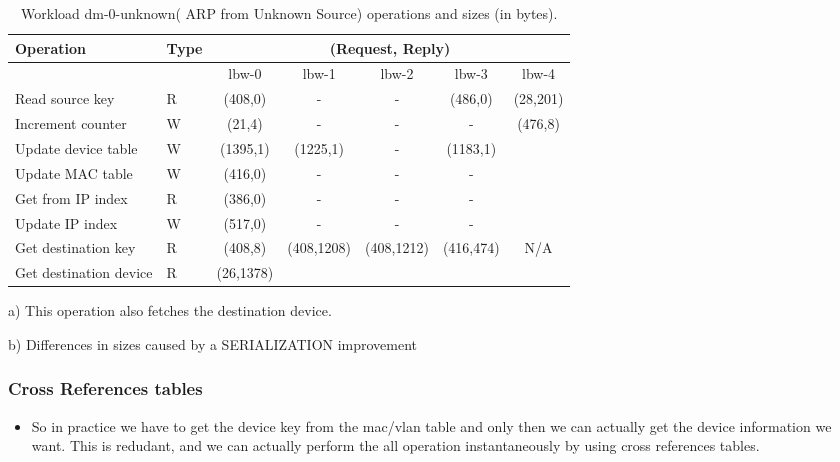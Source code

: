 {%

\begin{table}[ht]
\small
\centering 
\begin{threeparttable}
\begin{tabular}{ll ccccc}
 Operation & Type &  \multicolumn{5}{c}{ (Request, Reply) } \\  \midrule
&  & lbw-0 & lbw-1  & lbw-2 & lbw-3 & lbw-4 \\ \toprule 
Read source key & R & (408,0) & - & - & (486,0) & (28,201)\tnote{a}\\
Increment counter & W & (21,4) & -  & - & - & \multirow{5}{*}{(476,8)} \\
Update device table & W & (1395,1) & (1225,1)\tnote{b}  & - &
(1183,1) & \\
Update MAC  table & W & (416,0) & - & - & -
& \\
Get from IP index & R & (386,0) & - & - & - & \\
Update IP index  & W & (517,0) & - & - & - & \\
Get destination key & R & (408,8) &
\multirow{2}{*}{(408,1208)}\tnote{b} & \multirow{2}{*}{(408,1212)} &
\multirow{2}{*}{(416,474)} & \multirow{2}{*}{N/A}  \\ 
Get destination device & R & (26,1378)  &  & & \\\bottomrule
\end{tabular}
\caption[Workload dm-0-unknown( ARP from Unknown Source)
operations]{Workload dm-0-unknown( ARP from Unknown Source) operations
  and sizes (in bytes).}
\begin{tablenotes}
\item [a)] This operation also fetches the destination device.
\item [b)] Differences in sizes caused by a SERIALIZATION improvement 
\end{tablenotes}
\end{threeparttable}
\end{table}


\subsubsection{Cross References tables}
\begin{itemize}
\item So in practice we have to get the device key from the mac/vlan
  table and only then we can actually get the device information we
  want. This is redudant, and we can actually perform the all
  operation instantaneously  by using cross references tables. 


\end{itemize}}

